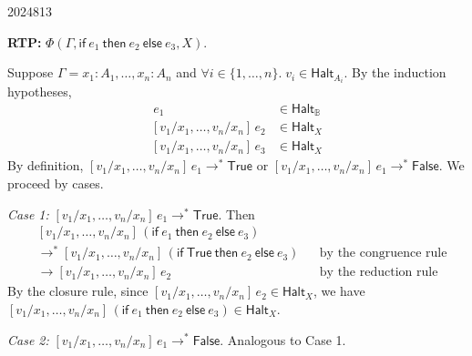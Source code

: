\documentclass[10pt,\jkfside,a4paper]{article}
\begin{document}
\begin{examquestion}{2024}{8}{13}
\begin{enumerate}
{                \textbf{RTP:} $\Phi(\Gamma, \mathsf{if}\ e_1\ \mathsf{then}\ e_2\ \mathsf{else}\ e_3, X)$.

                Suppose $\Gamma = x_1 : A_1, \ldots, x_n : A_n$ and $\forall i \in \{1, \ldots, n\}.\; v_i \in \mathsf{Halt}_{A_i}$. By the induction hypotheses,
                \begin{align*}
                    [v_1/x_1, \ldots, v_n/x_n]\,e_1 &\in \mathsf{Halt}_{\mathbb{B}} \\
                    [v_1/x_1, \ldots, v_n/x_n]\,e_2 &\in \mathsf{Halt}_X \\
                    [v_1/x_1, \ldots, v_n/x_n]\,e_3 &\in \mathsf{Halt}_X
                \end{align*}
                By definition, $[v_1/x_1, \ldots, v_n/x_n]\,e_1 \to^* \mathsf{True}$ or $[v_1/x_1, \ldots, v_n/x_n]\,e_1 \to^* \mathsf{False}$. We proceed by cases.

                \textit{Case 1:} $[v_1/x_1, \ldots, v_n/x_n]\,e_1 \to^* \mathsf{True}$. Then
                \begin{align*}
                    & [v_1/x_1, \ldots, v_n/x_n]\,(\mathsf{if}\ e_1\ \mathsf{then}\ e_2\ \mathsf{else}\ e_3) \\
                    &\to^* [v_1/x_1, \ldots, v_n/x_n]\,(\mathsf{if}\ \mathsf{True}\ \mathsf{then}\ e_2\ \mathsf{else}\ e_3) && \text{by the congruence rule} \\
                    &\to [v_1/x_1, \ldots, v_n/x_n]\,e_2 && \text{by the reduction rule}
                \end{align*}
                By the closure rule, since $[v_1/x_1, \ldots, v_n/x_n]\,e_2 \in \mathsf{Halt}_X$, we have $[v_1/x_1, \ldots, v_n/x_n]\,(\mathsf{if}\ e_1\ \mathsf{then}\ e_2\ \mathsf{else}\ e_3) \in \mathsf{Halt}_X$.

                \textit{Case 2:} $[v_1/x_1, \ldots, v_n/x_n]\,e_1 \to^* \mathsf{False}$. Analogous to Case 1.
            }

    \end{enumerate}

\end{examquestion}
\end{document}
